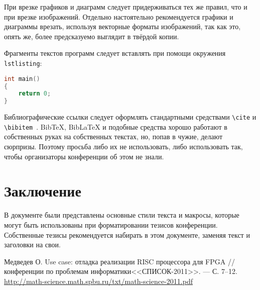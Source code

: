 \documentclass{math-mech-sci}
\begin{document}
При врезке графиков и диаграмм следует придерживаться тех же правил,
что и при врезке изображений. Отдельно настоятельно рекомендуется
графики и диаграммы врезать, используя векторные форматы изображений,
так как это, опять же, более предсказуемо выглядит в твёрдой копии.

Фрагменты текстов программ следует вставлять при помощи окружения
\texttt{lstlisting}:

\begin{lstlisting}[language=C,label=lst:code1]
int main()
{
    return 0;
}
\end{lstlisting}

Библиографические ссылки следует оформлять стандартными средствами
\texttt{\textbackslash{}cite} и
\texttt{\textbackslash{}bibitem}~\cite{medvedev2011}. BibTeX, BibLaTeX
и подобные средства хорошо работают в собственных руках на собственных
текстах, но, попав в чужие, делают сюрпризы.  Поэтому просьба либо их
не использовать, либо использовать так, чтобы организаторы конференции
об этом не знали.

\section{Заключение}

В документе были представлены основные стили текста и макросы, которые
могут быть использованы при форматировании тезисов конференции.
Собственные тезисы рекомендуется набирать в этом документе, заменяя
текст и заголовки на свои.

\begin{thebibliography}{8}

 Медведев О. Use case: отладка реализации RISC
  процессора для FPGA // %
  конференции по проблемам информатики<<СПИСОК-2011>>. --- %
  С. 7--12.
  \href{http://math-science.math.spbu.ru/txt/math-science-2011.pdf}{http://math-science.math.spbu.ru/txt/math-science-2011.pdf}

\end{thebibliography}
\end{document}
